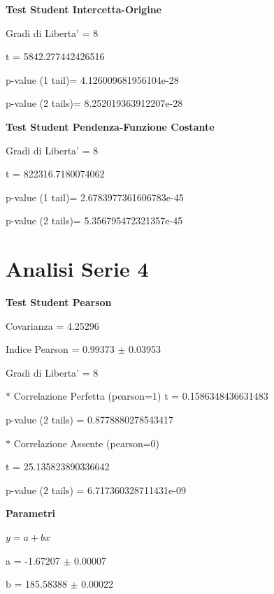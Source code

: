 \documentclass{article}
\begin{document}
\textbf{Test Student Intercetta-Origine}

Gradi di Liberta' = 8

t = 5842.277442426516

p-value (1 tail)= 4.126009681956104e-28

p-value (2 tails)= 8.252019363912207e-28

\textbf{Test Student Pendenza-Funzione Costante}

Gradi di Liberta' = 8

t = 822316.7180074062

p-value (1 tail)= 2.6783977361606783e-45

p-value (2 tails)= 5.356795472321357e-45

\section*{Analisi Serie 4}

\textbf{Test Student Pearson}

Covarianza = 4.25296

Indice Pearson = 0.99373 $\pm$ 0.03953

Gradi di Liberta' = 8

$\ast$ Correlazione Perfetta (pearson=1)
t = 0.1586348436631483

p-value (2 tails) = 0.8778880278543417

$\ast$ Correlazione Assente (pearson=0)

t = 25.135823890336642

p-value (2 tails) = 6.717360328711431e-09

\textbf{Parametri}

$y = a + bx$

a = -1.67207 $\pm$ 0.00007

b = 185.58388 $\pm$ 0.00022
\end{document}
